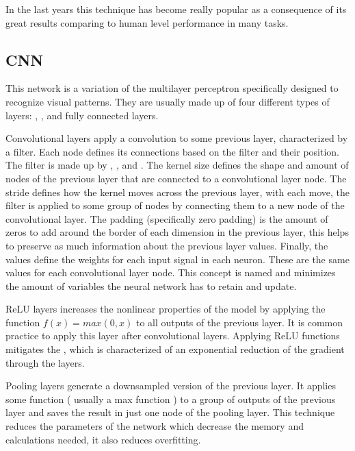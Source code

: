 In the last years this technique has become really popular as a consequence of its great results comparing to human level performance in many tasks.

\subsection{\acl{CNN}}

This network is a variation of the multilayer perceptron specifically designed to recognize visual patterns.
They are usually made up of four different types of layers: , ,
 and fully connected layers.

Convolutional layers apply a convolution to some previous layer, characterized by a filter.
Each node defines its connections based on the filter and their position. The filter is made up by ,
,  and .
The kernel size defines the shape and amount of nodes of the previous layer that are connected to a convolutional layer node.
The stride defines how the kernel moves across the previous layer, with each move, the filter is applied to some group of
nodes by connecting them to a new node of the convolutional layer.
The padding (specifically zero padding) is the amount of zeros to add around the border of each dimension in the previous
layer, this helps to preserve as much information about the previous layer values.
Finally, the values define the weights for each input signal in each neuron.
These are the same values for each convolutional layer node.
This concept is named  and minimizes the amount
of variables the neural network has to retain and update.

ReLU layers increases the nonlinear properties of the model by applying the function $f(x)=max(0,x)$ to all outputs of the previous layer.
It is common practice to apply this layer after convolutional layers.
Applying ReLU functions mitigates the , which is characterized of an exponential
reduction of the gradient through the layers.

Pooling layers generate a downsampled version of the previous layer.
It applies some function ( usually a max function ) to a group of outputs of the previous layer and saves the result in
just one node of the pooling layer.
This technique reduces the parameters of the network which decrease the memory and calculations needed, it also reduces overfitting.

